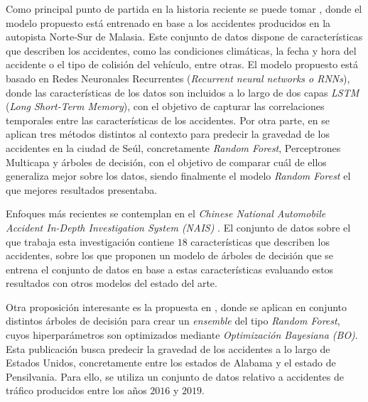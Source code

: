 Como principal punto de partida en la historia reciente se puede tomar \cite{app7060476}, donde el modelo propuesto está entrenado en base a los accidentes producidos en la autopista Norte-Sur de Malasia. Este conjunto de datos dispone de características que describen los accidentes, como las condiciones climáticas, la fecha y hora del accidente o el tipo de colisión del vehículo, entre otras. El modelo propuesto está basado en Redes Neuronales Recurrentes (\textit{Recurrent neural networks o RNNs}), donde las características de los datos son incluidos a lo largo de dos capas \textit{LSTM} (\textit{Long Short-Term Memory}), con el objetivo de capturar las correlaciones temporales entre las características de los accidentes. Por otra parte, en \cite{app10010129} se aplican tres métodos distintos al contexto para predecir la gravedad de los accidentes en la ciudad de Seúl, concretamente \textit{Random Forest}, Perceptrones Multicapa y árboles de decisión, con el objetivo de comparar cuál de ellos generaliza mejor sobre los datos, siendo finalmente el modelo \textit{Random Forest} el que mejores resultados presentaba.

Enfoques más recientes se contemplan en el \textit{Chinese National Automobile Accident In-Depth Investigation System (NAIS)} \cite{Yang2023}. El conjunto de datos sobre el que trabaja esta investigación contiene $18$ características que describen los accidentes, sobre los que proponen un modelo de árboles de decisión que se entrena el conjunto de datos en base a estas características evaluando estos resultados con otros modelos del estado del arte.

Otra proposición interesante es la propuesta en \cite{su14031729}, donde se aplican en conjunto distintos árboles de decisión para crear un \textit{ensemble} del tipo \textit{Random Forest}, cuyos hiperparámetros son optimizados mediante \textit{Optimización Bayesiana (BO)}. Esta publicación busca predecir la gravedad de los accidentes a lo largo de Estados Unidos, concretamente entre los estados de Alabama y el estado de Pensilvania. Para ello, se utiliza un conjunto de datos relativo a accidentes de tráfico producidos entre los años $2016$ y $2019$.

